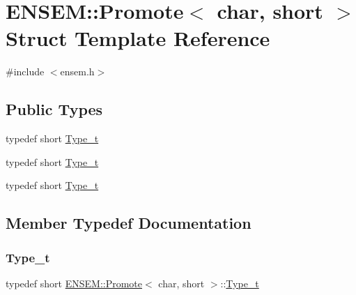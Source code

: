\hypertarget{structENSEM_1_1Promote_3_01char_00_01short_01_4}{}\section{E\+N\+S\+EM\+:\+:Promote$<$ char, short $>$ Struct Template Reference}
\label{structENSEM_1_1Promote_3_01char_00_01short_01_4}


{\ttfamily \#include $<$ensem.\+h$>$}

\subsection*{Public Types}
\begin{DoxyCompactItemize}
\item 
typedef short \mbox{\hyperlink{structENSEM_1_1Promote_3_01char_00_01short_01_4_a4f4c8da33427bfc6c1ff6d15e8639105}{Type\+\_\+t}}
\item 
typedef short \mbox{\hyperlink{structENSEM_1_1Promote_3_01char_00_01short_01_4_a4f4c8da33427bfc6c1ff6d15e8639105}{Type\+\_\+t}}
\item 
typedef short \mbox{\hyperlink{structENSEM_1_1Promote_3_01char_00_01short_01_4_a4f4c8da33427bfc6c1ff6d15e8639105}{Type\+\_\+t}}
\end{DoxyCompactItemize}


\subsection{Member Typedef Documentation}
\mbox{\label{structENSEM_1_1Promote_3_01char_00_01short_01_4_a4f4c8da33427bfc6c1ff6d15e8639105}} 
\subsubsection{\texorpdfstring{Type\_t}{Type\_t}\hspace{0.1cm}{\footnotesize\ttfamily [1/3]}}
{\footnotesize\ttfamily typedef short \mbox{\hyperlink{structENSEM_1_1Promote}{E\+N\+S\+E\+M\+::\+Promote}}$<$ char, short $>$\+::\mbox{\hyperlink{structENSEM_1_1Promote_3_01char_00_01short_01_4_a4f4c8da33427bfc6c1ff6d15e8639105}{Type\+\_\+t}}}

